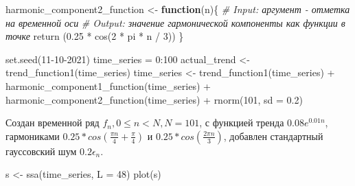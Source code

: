 \documentclass[
]{article}
\newenvironment{Shaded}{\begin{snugshade}}{\end{snugshade}}
\newcommand{\AttributeTok}[1]{\textcolor[rgb]{0.77,0.63,0.00}{#1}}
\newcommand{\CommentTok}[1]{\textcolor[rgb]{0.56,0.35,0.01}{\textit{#1}}}
\newcommand{\ControlFlowTok}[1]{\textcolor[rgb]{0.13,0.29,0.53}{\textbf{#1}}}
\newcommand{\DecValTok}[1]{\textcolor[rgb]{0.00,0.00,0.81}{#1}}
\newcommand{\FloatTok}[1]{\textcolor[rgb]{0.00,0.00,0.81}{#1}}
\newcommand{\FunctionTok}[1]{\textcolor[rgb]{0.00,0.00,0.00}{#1}}
\newcommand{\NormalTok}[1]{#1}
\newcommand{\OtherTok}[1]{\textcolor[rgb]{0.56,0.35,0.01}{#1}}
\newcommand{\SpecialCharTok}[1]{\textcolor[rgb]{0.00,0.00,0.00}{#1}}
\begin{document}
\begin{Shaded}
\begin{Highlighting}[]
\NormalTok{  harmonic\_component2\_function }\OtherTok{\textless{}{-}} \ControlFlowTok{function}\NormalTok{(n)\{}
    \CommentTok{\# Input: аргумент {-} отметка на временной оси}
    \CommentTok{\# Output: значение гармонической компоненты как функции в точке}
    \FunctionTok{return}\NormalTok{ (}\FloatTok{0.25} \SpecialCharTok{*} \FunctionTok{cos}\NormalTok{(}\DecValTok{2} \SpecialCharTok{*}\NormalTok{ pi }\SpecialCharTok{*}\NormalTok{ n }\SpecialCharTok{/} \DecValTok{3}\NormalTok{))}
\NormalTok{  \}}
\end{Highlighting}
\end{Shaded}

\begin{Shaded}
\begin{Highlighting}[]
  \FunctionTok{set.seed}\NormalTok{(}\DecValTok{11{-}10{-}2021}\NormalTok{)}
\NormalTok{  time\_series }\OtherTok{=} \DecValTok{0}\SpecialCharTok{:}\DecValTok{100}
\NormalTok{  actual\_trend }\OtherTok{\textless{}{-}} \FunctionTok{trend\_function1}\NormalTok{(time\_series)}
\NormalTok{  time\_series }\OtherTok{\textless{}{-}} \FunctionTok{trend\_function1}\NormalTok{(time\_series) }\SpecialCharTok{+} \FunctionTok{harmonic\_component1\_function}\NormalTok{(time\_series) }\SpecialCharTok{+} \FunctionTok{harmonic\_component2\_function}\NormalTok{(time\_series) }\SpecialCharTok{+} \FunctionTok{rnorm}\NormalTok{(}\DecValTok{101}\NormalTok{, }\AttributeTok{sd =} \FloatTok{0.2}\NormalTok{)}
\end{Highlighting}
\end{Shaded}

Создан временной ряд \(f_n , 0\leqslant n < N, N=101\), с функцией
тренда \(0.08e^{0.01n}\), гармониками
\(0.25 * cos(\frac{\pi n}{4} + \frac{\pi}{4})\) и
\(0.25 * cos(\frac{2 \pi n}{3})\), добавлен стандартный гауссовский шум
\(0.2 \epsilon_n\).

\begin{Shaded}
\begin{Highlighting}[]
\NormalTok{  s }\OtherTok{\textless{}{-}} \FunctionTok{ssa}\NormalTok{(time\_series, }\AttributeTok{L =} \DecValTok{48}\NormalTok{)}
  \FunctionTok{plot}\NormalTok{(s)}
\end{Highlighting}
\end{Shaded}
\end{document}
